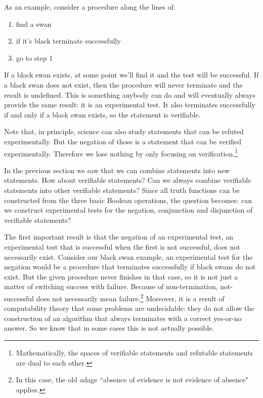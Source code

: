 \documentclass[11pt,letterpaper,fleqn]{memoir} %
\begin{document}
As an example, consider a procedure along the lines of:
\begin{enumerate}
	\item find a swan
	\item if it's black terminate successfully
	\item go to step 1
\end{enumerate}
If a black swan exists, at some point we'll find it and the test will be successful. If a black swan does not exist, then the procedure will never terminate and the result is undefined. This is something anybody can do and will eventually always provide the same result: it is an experimental test. It also terminates successfully if and only if a black swan exists, so the statement  is verifiable.

Note that, in principle, science can also study statements that can be refuted experimentally. But the negation of those is a statement that can be verified experimentally. Therefore we lose nothing by only focusing on verification.\footnote{Mathematically, the spaces of verifiable statements and refutable statements are dual to each other.}

In the previous section we saw that we can combine statements into new statements. How about verifiable statements? Can we always combine verifiable statements into other verifiable statements? Since all truth functions can be constructed from the three basic Boolean operations, the question becomes: can we construct experimental tests for the negation, conjunction and disjunction of verifiable statements?

The first important result is that the negation of an experimental test, an experimental test that is successful when the first is not successful, does not necessarily exist. Consider our black swan example, an experimental test for the negation would be a procedure that terminates successfully if black swans do not exist. But the given procedure never finishes in that case, so it is not just a matter of switching success with failure. Because of non-termination, not-successful does not necessarily mean failure.\footnote{In this case, the old adage ``absence of evidence is not evidence of absence" applies.} Moreover, it is a result of computability theory that some problems are undecidable: they do not allow the construction of an algorithm that always terminates with a correct yes-or-no answer. So we know that in some cases this is not actually possible.
\end{document}
